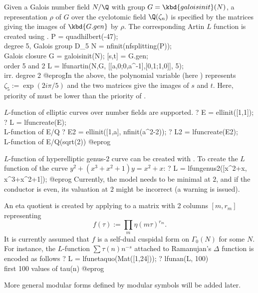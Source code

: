 Given a Galois number field $N/\Q$ with group $G = \kbd{galoisinit}(N)$,
a representation $\rho$ of $G$ over the cyclotomic field $\Q(\zeta_n)$
is specified by the matrices giving the images of $\kbd{G.gen}$ by $\rho$.
The corresponding Artin $L$ function is created using .
\bprog
   P = quadhilbert(-47); \\  degree 5, Galois group D_5
   N = nfinit(nfsplitting(P)); \\ Galois closure
   G = galoisinit(N);
   [s,t] = G.gen; \\ order 5 and 2
   L = lfunartin(N,G, [[a,0;0,a^-1],[0,1;1,0]], 5); \\ irr. degree 2
@eprog\noindent In the above, the polynomial variable (here ) represents
$\zeta_5 := \exp(2i\pi/5)$ and the two matrices give the images of
$s$ and $t$. Here, priority of  must be lower than the priority
of .


$L$-function of elliptic curves over number fields are supported.
\bprog
? E = ellinit([1,1]);
? L = lfuncreate(E);  \\ L-function of E/Q
? E2 = ellinit([1,a], nfinit(a^2-2));
? L2 = lfuncreate(E2);  \\ L-function of E/Q(sqrt(2))
@eprog

$L$-function of hyperelliptic genus-$2$ curve can be created with
. To create the $L$ function of the curve
$y^2+(x^3+x^2+1)y = x^2+x$:
\bprog
? L = lfungenus2([x^2+x, x^3+x^2+1]);
@eprog
Currently, the model needs to be minimal at $2$, and if the conductor is even,
its valuation at $2$ might be incorrect (a warning is issued).


An eta quotient is created by applying  to a matrix with
2 columns $[m, r_m]$ representing
$$ f(\tau) := \prod_m \eta(m\tau)^{r_m}. $$
It is currently assumed that $f$ is a self-dual cuspidal form on
$\Gamma_0(N)$ for some $N$.
For instance, the $L$-function $\sum \tau(n) n^{-s}$
attached to Ramanujan's $\Delta$ function is encoded as follows
\bprog
? L = lfunetaquo(Mat([1,24]));
? lfunan(L, 100)  \\ first 100 values of tau(n)
@eprog

More general modular forms defined by modular symbols will be added later.


